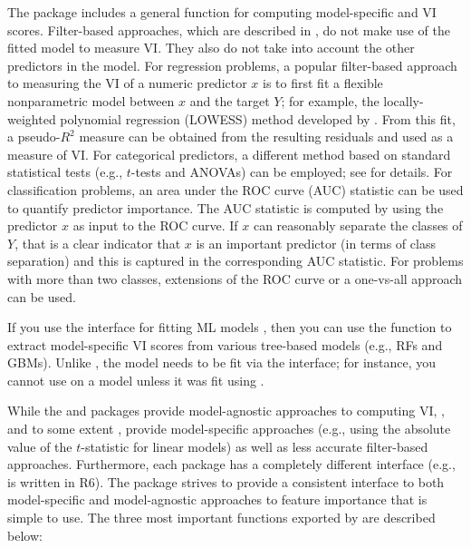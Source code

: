 The  package \citep{R-caret} includes a general
 function for computing model-specific and
 VI scores. Filter-based approaches, which are
described in \citet{applied-kuhn-2013}, do not make use of the fitted
model to measure VI. They also do not take into account the other
predictors in the model. For regression problems, a popular filter-based
approach to measuring the VI of a numeric predictor \(x\) is to first
fit a flexible nonparametric model between \(x\) and the target \(Y\);
for example, the locally-weighted polynomial regression (LOWESS) method
developed by \citet{robust-cleveland-1979}. From this fit, a
pseudo-\(R^2\) measure can be obtained from the resulting residuals and
used as a measure of VI. For categorical predictors, a different method
based on standard statistical tests (e.g., \(t\)-tests and ANOVAs) can
be employed; see \citet{applied-kuhn-2013} for details. For
classification problems, an area under the ROC curve (AUC) statistic can
be used to quantify predictor importance. The AUC statistic is computed
by using the predictor \(x\) as input to the ROC curve. If \(x\) can
reasonably separate the classes of \(Y\), that is a clear indicator that
\(x\) is an important predictor (in terms of class separation) and this
is captured in the corresponding AUC statistic. For problems with more
than two classes, extensions of the ROC curve or a one-vs-all approach
can be used.

If you use the  interface for fitting ML models
\citep{R-mlr}, then you can use the 
function to extract model-specific VI scores from various tree-based
models (e.g., RFs and GBMs). Unlike , the model needs to be
fit via the  interface; for instance, you cannot use
 on a  \citep{R-ranger}
model unless it was fit using .

While the  and  packages provide model-agnostic
approaches to computing VI, , and to some extent ,
provide model-specific approaches (e.g., using the absolute value of the
\(t\)-statistic for linear models) as well as less accurate filter-based
approaches. Furthermore, each package has a completely different
interface (e.g.,  is written in R6). The  package
\citep{R-vip} strives to provide a consistent interface to both
model-specific and model-agnostic approaches to feature importance that
is simple to use. The three most important functions exported by
 are described below:

